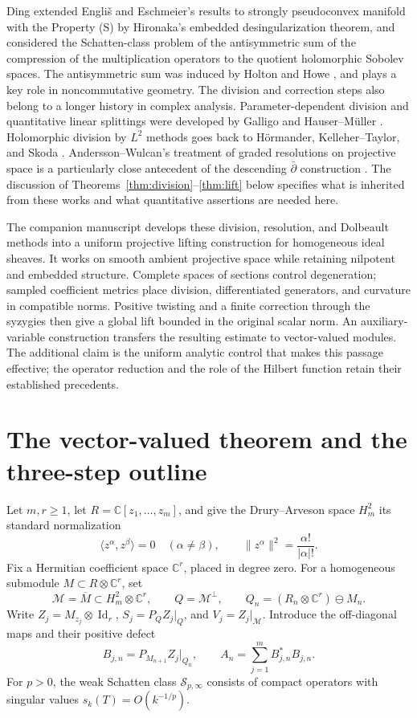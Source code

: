 \documentclass[11pt,reqno]{amsart}
\theoremstyle{remark}
\newcommand{\C}{\mathbb C}
\newcommand{\cS}{\mathcal S}
\newcommand{\dbar}{\bar\partial}
\DeclareMathOperator{\Id}{Id}
\begin{document}
Ding \cite{Ding26} extended Engli\v{s} and Eschmeier's results  to strongly pseudoconvex  manifold with the Property (S) by Hironaka’s embedded desingularization theorem, and considered the  Schatten-class problem of the antisymmetric sum of the compression of the multiplication operators to the quotient  holomorphic Sobolev spaces.
The antisymmetric sum was induced by Holton and Howe \cite{HeltonHowe75}, and plays a key role in noncommutative geometry. The division and correction steps also belong to a longer history
in complex analysis. Parameter-dependent division and quantitative
linear splittings were developed by Galligo and Hauser--M\"uller
\cite{Galligo,HauserMuller}. Holomorphic division by $L^2$ methods
goes back to H\"ormander, Kelleher--Taylor, and Skoda
\cite{HormanderGenerators,KelleherTaylor,Skoda1972,Skoda1978}.
Andersson--Wulcan's treatment of graded resolutions on projective
space is a particularly close antecedent of the descending
$\dbar$ construction \cite[Section~6]{AnderssonWulcan}.
The discussion of Theorems~\ref{thm:division}--\ref{thm:lift} below
specifies what is inherited from these works and what quantitative
assertions are needed here.

The companion manuscript \cite{DingFangTang, Companion} develops these division,
resolution, and Dolbeault methods into a uniform projective lifting
construction for homogeneous ideal sheaves. It works on smooth
ambient projective space while retaining nilpotent and embedded
structure. Complete spaces of sections control degeneration; sampled
coefficient metrics place division, differentiated generators, and
curvature in compatible norms. Positive twisting and a finite
correction through the syzygies then give a global lift bounded in
the original scalar norm. An auxiliary-variable construction transfers
the resulting estimate to vector-valued modules. The additional claim
is the uniform analytic control that makes this passage effective;
the operator reduction and the role of the Hilbert function retain
their established precedents.

\section{The vector-valued theorem and the three-step outline}

Let $m,r\ge1$, let $R=\C[z_1,\ldots,z_m]$, and give the Drury--Arveson space $H_m^2$
its standard normalization
\[
 \langle z^\alpha,z^\beta\rangle=0\quad(\alpha\ne\beta),
 \qquad \|z^\alpha\|^2=\frac{\alpha!}{|\alpha|!}.
\]
Fix a Hermitian coefficient space $\C^r$, placed in degree zero.
For a homogeneous submodule $M\subset R\otimes\C^r$, set
\[
 \mathcal M=\overline M\subset H_m^2\otimes\C^r,\qquad
 Q=\mathcal M^\perp,\qquad Q_n=(R_n\otimes\C^r)\ominus M_n.
\]
Write $Z_j=M_{z_j}\otimes\Id_r$, $S_j=P_QZ_j|_Q$, and
$V_j=Z_j|_{\mathcal M}$. Introduce the off-diagonal maps and their
positive defect
\begin{equation}\label{eq:defect}
 B_{j,n}=P_{M_{n+1}}Z_j|_{Q_n},
 \qquad A_n=\sum_{j=1}^m B_{j,n}^*B_{j,n}.
\end{equation}
For $p>0$, the weak Schatten class $\cS_{p,\infty}$ consists of compact
operators with singular values $s_k(T)=O(k^{-1/p})$.
\end{document}
